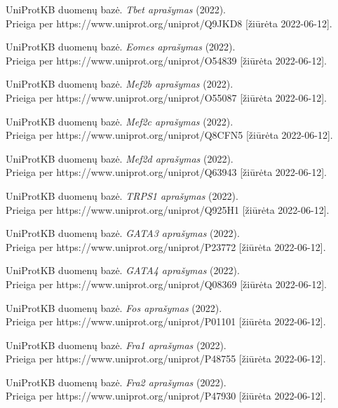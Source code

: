 \documentclass[12pt]{article}
\begin{document}
\begin{thebibliography}{99}
 UniProtKB duomenų bazė. \emph{Tbet aprašymas} (2022).\\
Prieiga per https://www.uniprot.org/uniprot/Q9JKD8 [žiūrėta 2022-06-12].

 UniProtKB duomenų bazė. \emph{Eomes aprašymas} (2022).\\
Prieiga per https://www.uniprot.org/uniprot/O54839 [žiūrėta 2022-06-12].

 UniProtKB duomenų bazė. \emph{Mef2b aprašymas} (2022).\\
Prieiga per https://www.uniprot.org/uniprot/O55087 [žiūrėta 2022-06-12].

 UniProtKB duomenų bazė. \emph{Mef2c aprašymas} (2022).\\
Prieiga per https://www.uniprot.org/uniprot/Q8CFN5 [žiūrėta 2022-06-12].

 UniProtKB duomenų bazė. \emph{Mef2d aprašymas} (2022).\\
Prieiga per https://www.uniprot.org/uniprot/Q63943 [žiūrėta 2022-06-12].

 UniProtKB duomenų bazė. \emph{TRPS1 aprašymas} (2022).\\
Prieiga per https://www.uniprot.org/uniprot/Q925H1 [žiūrėta 2022-06-12].

 UniProtKB duomenų bazė. \emph{GATA3 aprašymas} (2022).\\
Prieiga per https://www.uniprot.org/uniprot/P23772 [žiūrėta 2022-06-12].

 UniProtKB duomenų bazė. \emph{GATA4 aprašymas} (2022).\\
Prieiga per https://www.uniprot.org/uniprot/Q08369 [žiūrėta 2022-06-12].

 UniProtKB duomenų bazė. \emph{Fos aprašymas} (2022).\\
Prieiga per https://www.uniprot.org/uniprot/P01101 [žiūrėta 2022-06-12].

 UniProtKB duomenų bazė. \emph{Fra1 aprašymas} (2022).\\
Prieiga per https://www.uniprot.org/uniprot/P48755 [žiūrėta 2022-06-12].

 UniProtKB duomenų bazė. \emph{Fra2 aprašymas} (2022).\\
Prieiga per https://www.uniprot.org/uniprot/P47930 [žiūrėta 2022-06-12].

\end{thebibliography}

\newpage
\end{document}
